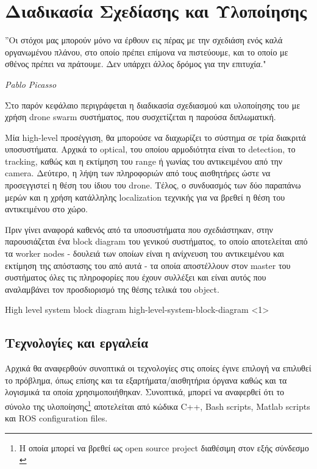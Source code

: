 \chapter{Διαδικασία Σχεδίασης και Υλοποίησης} %
\label{chap:Chapter4}  %

\epigraph{”Οι στόχοι μας μπορούν μόνο να έρθουν εις πέρας με την σχεδιάση ενός καλά οργανωμένου πλάνου, στο οποίο πρέπει επίμονα να πιστεύουμε, και το οποίο με σθένος πρέπει να πράτουμε. Δεν υπάρχει άλλος δρόμος για την επιτυχία." }{\textit{Pablo Picasso}}

Στο παρόν κεφάλαιο περιγράφεται η διαδικασία σχεδιασμού και υλοποίησης του  με χρήση drone swarm συστήματος, που συσχετίζεται η παρούσα διπλωματική. 

Μία high-level προσέγγιση, θα μπορούσε να διαχωρίζει το σύστημα σε τρία διακριτά
υποσυστήματα. Αρχικά το optical, του οποίου αρμοδιότητα είναι το detection, το tra\-cking, καθώς και η εκτίμηση
του range ή γωνίας του αντικειμένου από την camera. Δεύτερο, η λήψη των πληροφοριών από τους αισθητήρες ώστε να προσεγγιστεί η θέση του ίδιου
του drone. Τέλος, ο συνδυασμός των δύο παραπάνω μερών και η χρήση κατάλληλης localization τεχνικής για να βρεθεί η θέση του αντικειμένου
στο  χώρο.

Πριν γίνει αναφορά καθενός από τα υποσυστήματα που σχεδιάστηκαν, στην  παρουσιάζεται ένα block diagram του γενικού συστήματος, το οποίο αποτελείται από τα worker nodes - δουλειά των οποίων είναι η ανίχνευση του αντικειμένου και εκτίμηση της απόστασης του από αυτά - τα οποία αποστέλλουν στον master του συστήματος όλες τις πληροφορίες που έχουν συλλέξει και είναι αυτός που α\-να\-λα\-μβά\-νει τον προσδιορισμό της θέσης τελικά του object.

%
{High level system block diagram}%
{high-level-system-block-diagram}%
<1>


\section{Τεχνολογίες και εργαλεία} \label{sec:design-tools}
Αρχικά θα αναφερθούν συνοπτικά οι τεχνολογίες στις οποίες έγινε επιλογή να επιλυθεί το πρόβλημα,
όπως επίσης και τα εξαρτήματα/αισθητήρια όργανα καθώς και τα λογισμικά τα οποία χρησιμοποιήθηκαν. 
Συνοπτικά, μπορεί να αναφερθεί ότι το σύνολο της υλοποίησης\footnote{Η οποία μπορεί να βρεθεί ως open source project διαθέσιμη στον εξής σύνδεσμο \cite{thesis-project-location}} αποτελείται από κώδικα C++, Bash scripts, Matlab scripts και ROS configuration files.

